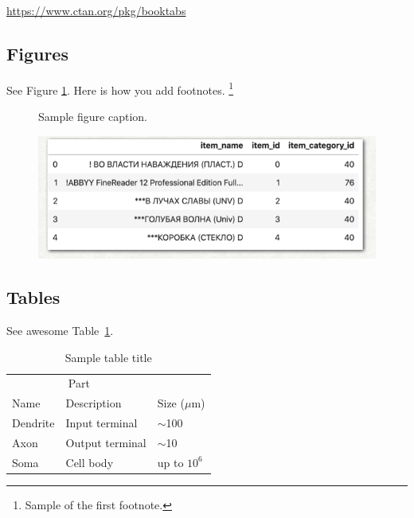 \documentclass{article}
\begin{document}
\begin{center}
  \url{https://www.ctan.org/pkg/booktabs}
\end{center}


\subsection{Figures}
\lipsum[10] 
See Figure \ref{fig:fig1}. Here is how you add footnotes. \footnote{Sample of the first footnote.}
\lipsum[11] 

\begin{figure}
  \centering
  \fbox{\rule[-.5cm]{4cm}{4cm} \rule[-.5cm]{4cm}{0cm}}
  \caption{Sample figure caption.}
  \label{fig:fig1}
\end{figure}

\begin{figure} %
    \centering
    \includegraphics{test.png}
\end{figure}

\subsection{Tables}
\lipsum[12]
See awesome Table~\ref{tab:table}.

\begin{table}
 \caption{Sample table title}
  \centering
  \begin{tabular}{lll}
    \toprule
    \multicolumn{2}{c}{Part}                   \\
    \cmidrule(r){1-2}
    Name     & Description     & Size ($\mu$m) \\
    \midrule
    Dendrite & Input terminal  & $\sim$100     \\
    Axon     & Output terminal & $\sim$10      \\
    Soma     & Cell body       & up to $10^6$  \\
    \bottomrule
  \end{tabular}
  \label{tab:table}
\end{table}
\end{document}
